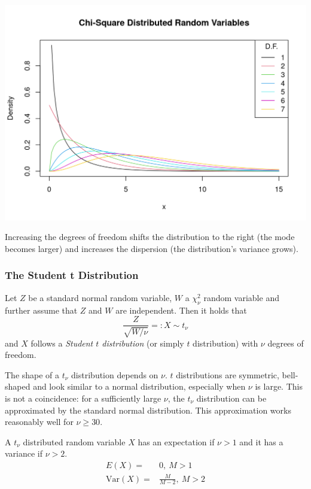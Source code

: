 \documentclass[
  14pt,
]{memoir}
\begin{document}
\begin{center}\includegraphics[width=0.8\linewidth]{figure/minimal-unnamed-chunk-48-1} \end{center}

Increasing the degrees of freedom shifts the distribution to the right (the mode becomes larger) and increases the dispersion (the distribution's variance grows).

\hypertarget{the-student-t-distribution}{%
\subsubsection{The Student t Distribution}\label{the-student-t-distribution}}

Let \(Z\) be a standard normal random variable, \(W\) a \(\chi^2_\nu\) random variable and further assume that \(Z\) and \(W\) are independent. Then it holds that
\[
\frac{Z}{\sqrt{W/\nu}} =:X \sim t_\nu
\]
and \(X\) follows a \emph{Student \(t\) distribution} (or simply \(t\) distribution) with \(\nu\) degrees of freedom.

The shape of a \(t_\nu\) distribution depends on \(\nu\). \(t\) distributions are symmetric, bell-shaped and look similar to a normal distribution, especially when \(\nu\) is large. This is not a coincidence: for a sufficiently large \(\nu\), the \(t_\nu\) distribution can be approximated by the standard normal distribution. This approximation works reasonably well for \(\nu\geq 30\).

A \(t_\nu\) distributed random variable \(X\) has an expectation if \(\nu>1\) and it has a variance if \(\nu>2\).
\begin{align*}
  E(X) =& 0, \ M>1 \\
  \text{Var}(X) =& \frac{M}{M-2}, \ M>2
\end{align*}
\end{document}
